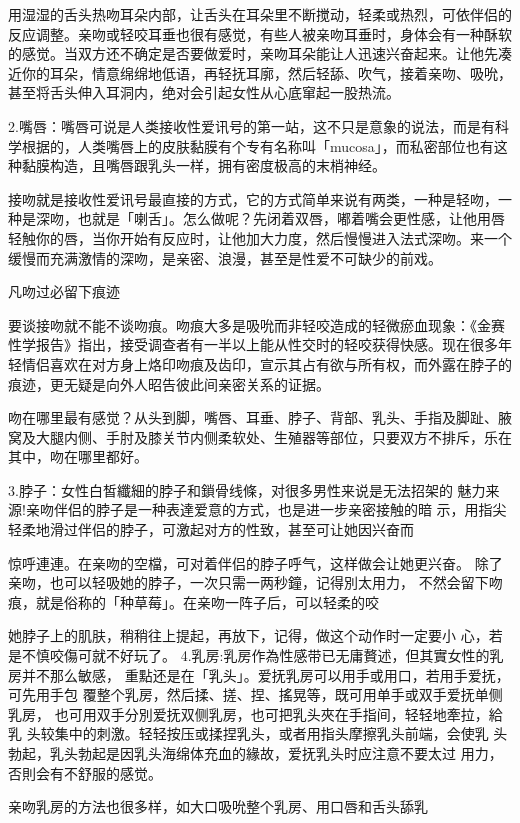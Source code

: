 \documentclass[12pt,UTF8]{ctexbook}
\begin{document}
用湿湿的舌头热吻耳朵内部，让舌头在耳朵里不断搅动，轻柔或热烈，可依伴侣的反应调整。亲吻或轻咬耳垂也很有感觉，有些人被亲吻耳垂时，身体会有一种酥软的感觉。当双方还不确定是否要做爱时，亲吻耳朵能让人迅速兴奋起来。让他先凑近你的耳朵，情意绵绵地低语，再轻抚耳廓，然后轻舔、吹气，接着亲吻、吸吮，甚至将舌头伸入耳洞内，绝对会引起女性从心底窜起一股热流。

2.嘴唇：嘴唇可说是人类接收性爱讯号的第一站，这不只是意象的说法，而是有科学根据的，人类嘴唇上的皮肤黏膜有个专有名称叫「mucosa」，而私密部位也有这种黏膜构造，且嘴唇跟乳头一样，拥有密度极高的末梢神经。

接吻就是接收性爱讯号最直接的方式，它的方式简单来说有两类，一种是轻吻，一种是深吻，也就是「喇舌」。怎么做呢？先闭着双唇，嘟着嘴会更性感，让他用唇轻触你的唇，当你开始有反应时，让他加大力度，然后慢慢进入法式深吻。来一个缓慢而充满激情的深吻，是亲密、浪漫，甚至是性爱不可缺少的前戏。

凡吻过必留下痕迹

要谈接吻就不能不谈吻痕。吻痕大多是吸吮而非轻咬造成的轻微瘀血现象：《金赛性学报告》指出，接受调查者有一半以上能从性交时的轻咬获得快感。现在很多年轻情侣喜欢在对方身上烙印吻痕及齿印，宣示其占有欲与所有权，而外露在脖子的痕迹，更无疑是向外人昭告彼此间亲密关系的证据。

吻在哪里最有感觉？从头到脚，嘴唇、耳垂、脖子、背部、乳头、手指及脚趾、腋窝及大腿内侧、手肘及膝关节内侧柔软处、生殖器等部位，只要双方不排斥，乐在其中，吻在哪里都好。

3.脖子：女性白皙纖細的脖子和鎖骨线條，对很多男性来说是无法招架的
魅力来源!亲吻伴侣的脖子是一种表達爱意的方式，也是进一步亲密接触的暗
示，用指尖轻柔地滑过伴侣的脖子，可激起对方的性致，甚至可让她因兴奋而

惊呼連連。在亲吻的空檔，可对着伴侣的脖子呼气，这样做会让她更兴奋。
除了亲吻，也可以轻吸她的脖子，一次只需一两秒鐘，记得別太用力，
不然会留下吻痕，就是俗称的「种草莓」。在亲吻一阵子后，可以轻柔的咬

她脖子上的肌肤，稍稍往上提起，再放下，记得，做这个动作时一定要小
心，若是不慎咬傷可就不好玩了。
4.乳房:乳房作為性感带已无庸贅述，但其實女性的乳房并不那么敏感，
重點还是在「乳头」。爱抚乳房可以用手或用口，若用手爱抚，可先用手包
覆整个乳房，然后揉、搓、捏、搖晃等，既可用单手或双手爱抚单侧乳房，
也可用双手分別爱抚双侧乳房，也可把乳头夾在手指间，轻轻地牽拉，給乳
头较集中的刺激。轻轻按压或揉捏乳头，或者用指头摩擦乳头前端，会使乳
头勃起，乳头勃起是因乳头海绵体充血的緣故，爱抚乳头时应注意不要太过
用力，否則会有不舒服的感觉。

亲吻乳房的方法也很多样，如大口吸吮整个乳房、用口唇和舌头舔乳
\end{document}
